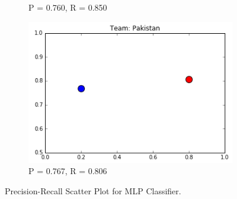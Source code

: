 \documentclass[a4paper, 10pt, conference]{IEEEtran}
\begin{document}
\begin{figure}[h!]
\begin{subfigure}[b]{0.4\linewidth}
    \caption{P = 0.760, R = 0.850}
  \end{subfigure}
  \begin{subfigure}[b]{0.4\linewidth}
    \includegraphics[width=\linewidth]{MLPCLF_Pakistan.png}
    \caption{P = 0.767, R = 0.806}
  \end{subfigure}
  \caption{Precision-Recall Scatter Plot for MLP Classifier.}
  \label{fig:mlpclfPlots}
\end{figure}
\end{document}
